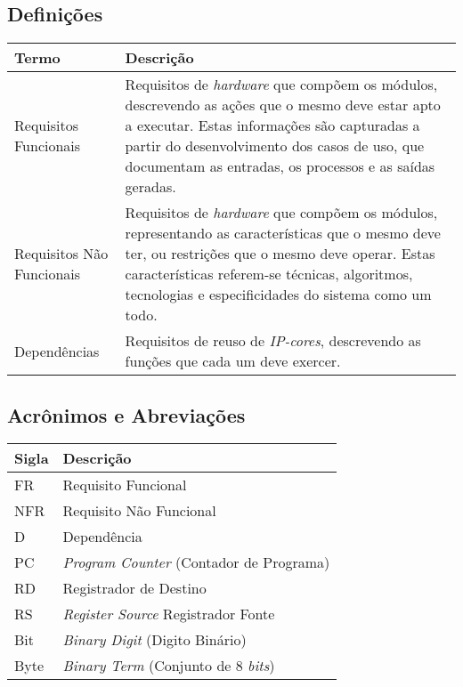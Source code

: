 \documentclass{article}
\begin{document}
  \subsection{Definições}
    \FloatBarrier
    \begin{table}[H]
      \begin{center}
        \begin{tabular}[pos]{|m{5cm} | m{9cm}|}
          \hline
          \cellcolor[gray]{0.9}\textbf{Termo} & \cellcolor[gray]{0.9}\textbf{Descrição} \\ \hline
          Requisitos Funcionais & Requisitos de \textit{hardware} que compõem os módulos, descrevendo as ações que o mesmo deve estar apto a executar. Estas informações são capturadas a partir do desenvolvimento dos casos de uso, que documentam as entradas, os processos e as saídas geradas.  \\ \hline
          Requisitos Não Funcionais & Requisitos de \textit{hardware} que compõem os módulos, representando as características que o mesmo deve ter, ou restrições que o mesmo deve operar. Estas características referem-se técnicas, algoritmos, tecnologias e especificidades do sistema como um todo.  \\ \hline
          Dependências & Requisitos de reuso de \textit{IP-cores}, descrevendo as funções que cada um deve exercer. \\ \hline
        \end{tabular}
      \end{center}
    \end{table}

  \subsection{Acrônimos e Abreviações}
    \FloatBarrier
    \begin{table}[H]
      \begin{center}
        \begin{tabular}[pos]{|m{2cm} | m{12cm}|}
          \hline
          \cellcolor[gray]{0.9}\textbf{Sigla} & \cellcolor[gray]{0.9}\textbf{Descrição} \\ \hline
          FR      & Requisito Funcional  \\ \hline
          NFR     & Requisito Não Funcional  \\ \hline
          D       & Dependência  \\ \hline
          PC      & \textit{Program Counter} (Contador de Programa)  \\ \hline
          RD      & Registrador de Destino  \\ \hline
          RS      & \textit{Register Source} Registrador Fonte  \\ \hline
          Bit	  & \textit{Binary Digit} (Digito Binário) \\ \hline
          Byte	  & \textit{Binary Term} (Conjunto de 8 \textit{bits}) \\ \hline
        \end{tabular}
      \end{center}
    \end{table}
\end{document}
